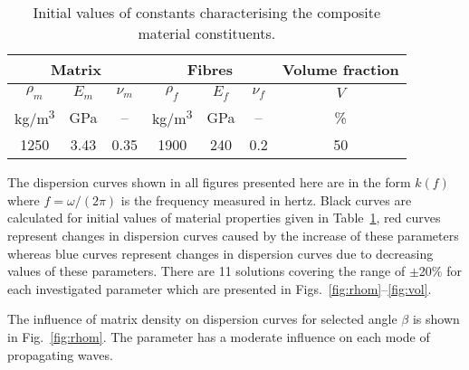 \documentclass[preprint,12pt]{elsarticle}
\begin{document}
 \begin{table}[h]
 	\renewcommand{\arraystretch}{1.3}
 	\centering \footnotesize
 	\caption{Initial values of constants characterising the composite material constituents.}
 	\begin{tabular}{ccccccc} 
 		\toprule
 		\multicolumn{3}{c}{\textbf{Matrix} }	& \multicolumn{3}{c}{\textbf{Fibres} } & \textbf{Volume fraction}	 \\ 
 		\midrule
 		$\rho_m$ & $E_m$ & $\nu_m$  & $\rho_f$ & $E_f$ & $\nu_f$ & $V$\\
 		kg/m\textsuperscript{3} &GPa& --  & kg/m\textsuperscript{3}  & GPa& -- & \%\\ 
 		\cmidrule(lr){1-3} \cmidrule(lr){4-6} \cmidrule(lr){7-7}
 		1250 &3.43& 0.35& 1900 & 240 & 0.2 & 50\\
 		\bottomrule 
 	\end{tabular} 
 	\label{tab:matprop}
 \end{table}
 
 The dispersion curves shown in all figures presented here are in the form $k(f)$ where $f=\omega/(2 \pi)$ is the frequency measured in hertz. Black curves are calculated for initial values of material properties given in Table~\ref{tab:matprop}, red curves represent changes in dispersion curves caused by the increase of these parameters whereas blue curves represent changes in dispersion curves due to decreasing values of these parameters. There are 11 solutions covering the range of $\pm$20\% for each investigated parameter which are presented in Figs.~\ref{fig:rhom}--\ref{fig:vol}.
 
 The influence of matrix density on dispersion curves for selected angle $\beta$ is shown in Fig.~\ref{fig:rhom}. The parameter has a moderate influence on each mode of propagating waves.
 
\end{document}
